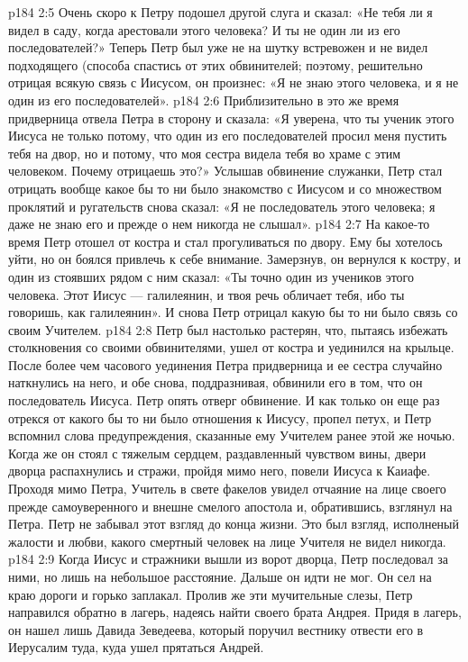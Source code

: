 \vs p184 2:5 Очень скоро к Петру подошел другой слуга и сказал: «Не тебя ли я видел в саду, когда арестовали этого человека? И ты не один ли из его последователей?» Теперь Петр был уже не на шутку встревожен и не видел подходящего (способа спастись от этих обвинителей; поэтому, решительно отрицая всякую связь с Иисусом, он произнес: «Я не знаю этого человека, и я не один из его последователей».
\vs p184 2:6 Приблизительно в это же время придверница отвела Петра в сторону и сказала: «Я уверена, что ты ученик этого Иисуса не только потому, что один из его последователей просил меня пустить тебя на двор, но и потому, что моя сестра видела тебя во храме с этим человеком. Почему отрицаешь это?» Услышав обвинение служанки, Петр стал отрицать вообще какое бы то ни было знакомство с Иисусом и со множеством проклятий и ругательств снова сказал: «Я не последователь этого человека; я даже не знаю его и прежде о нем никогда не слышал».
\vs p184 2:7 На какое\hyp{}то время Петр отошел от костра и стал прогуливаться по двору. Ему бы хотелось уйти, но он боялся привлечь к себе внимание. Замерзнув, он вернулся к костру, и один из стоявших рядом с ним сказал: «Ты точно один из учеников этого человека. Этот Иисус --- галилеянин, и твоя речь обличает тебя, ибо ты говоришь, как галилеянин». И снова Петр отрицал какую бы то ни было связь со своим Учителем.
\vs p184 2:8 Петр был настолько растерян, что, пытаясь избежать столкновения со своими обвинителями, ушел от костра и уединился на крыльце. После более чем часового уединения Петра придверница и ее сестра случайно наткнулись на него, и обе снова, поддразнивая, обвинили его в том, что он последователь Иисуса. Петр опять отверг обвинение. И как только он еще раз отрекся от какого бы то ни было отношения к Иисусу, пропел петух, и Петр вспомнил слова предупреждения, сказанные ему Учителем ранее этой же ночью. Когда же он стоял с тяжелым сердцем, раздавленный чувством вины, двери дворца распахнулись и стражи, пройдя мимо него, повели Иисуса к Каиафе. Проходя мимо Петра, Учитель в свете факелов увидел отчаяние на лице своего прежде самоуверенного и внешне смелого апостола и, обратившись, взглянул на Петра. Петр не забывал этот взгляд до конца жизни. Это был взгляд, исполненый жалости и любви, какого смертный человек на лице Учителя не видел никогда.
\vs p184 2:9 Когда Иисус и стражники вышли из ворот дворца, Петр последовал за ними, но лишь на небольшое расстояние. Дальше он идти не мог. Он сел на краю дороги и горько заплакал. Пролив же эти мучительные слезы, Петр направился обратно в лагерь, надеясь найти своего брата Андрея. Придя в лагерь, он нашел лишь Давида Зеведеева, который поручил вестнику отвести его в Иерусалим туда, куда ушел прятаться Андрей.
